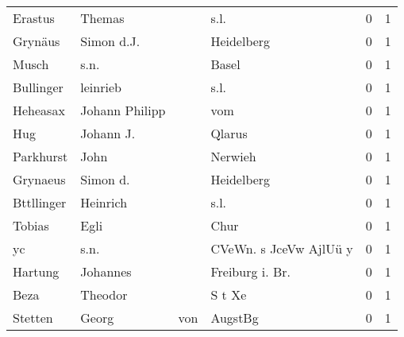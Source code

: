 \begin{center}
\begin{tiny}
\begin{longtabu}{llllrr}
                  Erastus &                             Themas &             &                                        s.l. &          0 &         1 \\
                  Grynäus &                         Simon d.J. &             &                                  Heidelberg &          0 &         1 \\
                    Musch &                               s.n. &             &                                       Basel &          0 &         1 \\
                Bullinger &                           leinrieb &             &                                        s.l. &          0 &         1 \\
                 Heheasax &                     Johann Philipp &             &                                         vom &          0 &         1 \\
                      Hug &                          Johann J. &             &                                      Qlarus &          0 &         1 \\
                Parkhurst &                               John &             &                                     Nerwieh &          0 &         1 \\
                 Grynaeus &                           Simon d. &             &                                  Heidelberg &          0 &         1 \\
               Bttllinger &                           Heinrich &             &                                        s.l. &          0 &         1 \\
                   Tobias &                               Egli &             &                                        Chur &          0 &         1 \\
                       yc &                               s.n. &             &                      CVeWn. s JceVw AjlUü y &          0 &         1 \\
                  Hartung &                           Johannes &             &                            Freiburg i. Br.  &          0 &         1 \\
                     Beza &                            Theodor &             &                                      S t Xe &          0 &         1 \\
                  Stetten &                              Georg &         von &                                     AugstBg &          0 &         1 \\

\end{longtabu}
\end{tiny}
\end{center}
